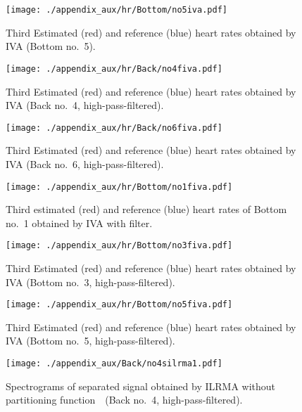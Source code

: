 \begin{figure}[tb]
\centering
\texttt{[image: ./appendix\_aux/hr/Bottom/no5iva.pdf]}
  \caption{Third Estimated (red) and reference (blue) heart rates obtained by IVA (Bottom no.~5).}
\end{figure}

\begin{figure}[tb]
\centering
\texttt{[image: ./appendix\_aux/hr/Back/no4fiva.pdf]}
  \caption{Third Estimated (red) and reference (blue) heart rates obtained by IVA (Back no.~4, high-pass-filtered).}
\end{figure}

\begin{figure}[tb]
\centering
\texttt{[image: ./appendix\_aux/hr/Back/no6fiva.pdf]}
  \caption{Third Estimated (red) and reference (blue) heart rates obtained by IVA (Back no.~6, high-pass-filtered).}
\end{figure}

\begin{figure}[tb]
\centering
\texttt{[image: ./appendix\_aux/hr/Bottom/no1fiva.pdf]}
  \caption{Third estimated (red) and reference (blue) heart rates of Bottom no.~1 obtained by IVA with filter.}
\end{figure}

\begin{figure}[tb]
\centering
\texttt{[image: ./appendix\_aux/hr/Bottom/no3fiva.pdf]}
  \caption{Third Estimated (red) and reference (blue) heart rates obtained by IVA (Bottom no.~3, high-pass-filtered).}
\end{figure}

\begin{figure}[tb]
\centering
\texttt{[image: ./appendix\_aux/hr/Bottom/no5fiva.pdf]}
  \caption{Third Estimated (red) and reference (blue) heart rates obtained by IVA (Bottom no.~5, high-pass-filtered).}
\end{figure}

\begin{figure}[tb]
\centering
\texttt{[image: ./appendix\_aux/Back/no4silrma1.pdf]}
\caption{Spectrograms of separated signal obtained by ILRMA without partitioning function　(Back no.~4, high-pass-filtered).}
\end{figure}

